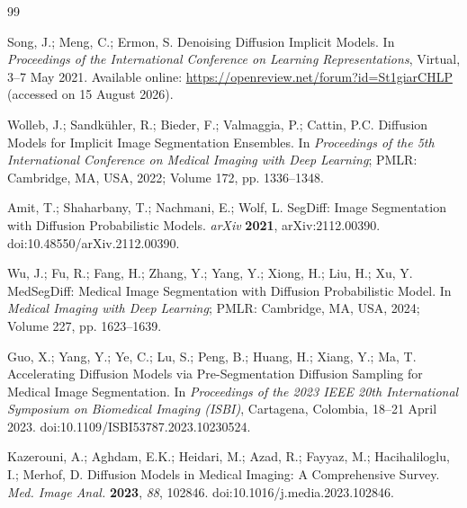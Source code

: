 \documentclass[jimaging,article,submit,pdftex,moreauthors]{Definitions/mdpi}%
\providecommand{\href}[2]{#2}
\begin{document}
\begin{thebibliography}{99}

Song, J.; Meng, C.; Ermon, S. Denoising Diffusion Implicit Models. In \textit{Proceedings of the International Conference on Learning Representations}, Virtual, 3--7 May 2021. Available online: \url{https://openreview.net/forum?id=St1giarCHLP} (accessed on 15 August 2026).




Wolleb, J.; Sandk\"uhler, R.; Bieder, F.; Valmaggia, P.; Cattin, P.C. Diffusion Models for Implicit Image Segmentation Ensembles. In \textit{Proceedings of the 5th International Conference on Medical Imaging with Deep Learning}; PMLR: Cambridge, MA, USA, 2022; Volume 172, pp. 1336--1348.




Amit, T.; Shaharbany, T.; Nachmani, E.; Wolf, L. SegDiff: Image Segmentation with Diffusion Probabilistic Models. \textit{arXiv} \textbf{2021}, arXiv:2112.00390. \href{https://doi.org/10.48550/arXiv.2112.00390}{doi:10.48550/arXiv.2112.00390}.




Wu, J.; Fu, R.; Fang, H.; Zhang, Y.; Yang, Y.; Xiong, H.; Liu, H.; Xu, Y. MedSegDiff: Medical Image Segmentation with Diffusion Probabilistic Model. In \textit{Medical Imaging with Deep Learning}; PMLR: Cambridge, MA, USA, 2024; Volume 227, pp. 1623--1639.




Guo, X.; Yang, Y.; Ye, C.; Lu, S.; Peng, B.; Huang, H.; Xiang, Y.; Ma, T. Accelerating Diffusion Models via Pre-Segmentation Diffusion Sampling for Medical Image Segmentation. In \textit{Proceedings of the 2023 IEEE 20th International Symposium on Biomedical Imaging (ISBI)}, Cartagena, Colombia, 18--21 April 2023. \href{https://doi.org/10.1109/ISBI53787.2023.10230524}{doi:10.1109/ISBI53787.2023.10230524}.




Kazerouni, A.; Aghdam, E.K.; Heidari, M.; Azad, R.; Fayyaz, M.; Hacihaliloglu, I.; Merhof, D. Diffusion Models in Medical Imaging: A Comprehensive Survey. \textit{Med. Image Anal.} \textbf{2023}, \textit{88}, 102846. \href{https://doi.org/10.1016/j.media.2023.102846}{doi:10.1016/j.media.2023.102846}.




\end{thebibliography}
\end{document}
